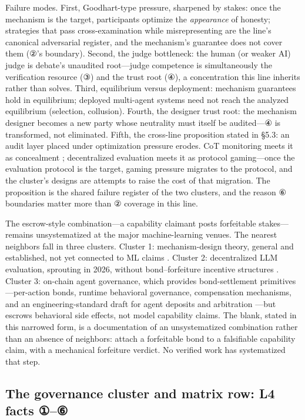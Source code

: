 \documentclass[11pt,a4paper]{article}
\begin{document}
Failure modes. First, Goodhart-type pressure, sharpened by stakes: once the mechanism is the target, participants optimize the \textit{appearance} of honesty; strategies that pass cross-examination while misrepresenting are the line's canonical adversarial register, and the mechanism's guarantee does not cover them (②'s boundary). Second, the judge bottleneck: the human (or weaker AI) judge is debate's unaudited root—judge competence is simultaneously the verification resource (③) and the trust root (④), a concentration this line inherits rather than solves. Third, equilibrium versus deployment: mechanism guarantees hold in equilibrium; deployed multi-agent systems need not reach the analyzed equilibrium (selection, collusion). Fourth, the designer trust root: the mechanism designer becomes a new party whose neutrality must itself be audited—④ is transformed, not eliminated. Fifth, the cross-line proposition stated in §5.3: an audit layer placed under optimization pressure erodes. CoT monitoring meets it as concealment \cite{key27}; decentralized evaluation meets it as protocol gaming—once the evaluation protocol is the target, gaming pressure migrates to the protocol, and the cluster's designs \cite{key39,key40,key41} are attempts to raise the cost of that migration. The proposition is the shared failure register of the two clusters, and the reason ⑥ boundaries matter more than ② coverage in this line.

The escrow-style combination—a capability claimant posts forfeitable stakes—remains unsystematized at the major machine-learning venues. The nearest neighbors fall in three clusters. Cluster 1: mechanism-design theory, general and established, not yet connected to ML claims \cite{key38}. Cluster 2: decentralized LLM evaluation, sprouting in 2026, without bond–forfeiture incentive structures \cite{key39,key40,key41}. Cluster 3: on-chain agent governance, which provides bond-settlement primitives—per-action bonds, runtime behavioral governance, compensation mechanisms, and an engineering-standard draft for agent deposits and arbitration \cite{key42,key43,key44,key45}—but escrows behavioral side effects, not model capability claims. The blank, stated in this narrowed form, is a documentation of an unsystematized combination rather than an absence of neighbors: attach a forfeitable bond to a falsifiable capability claim, with a mechanical forfeiture verdict. No verified work has systematized that step.

\subsection{The governance cluster and matrix row: L4 facts ①–⑥}
\end{document}
